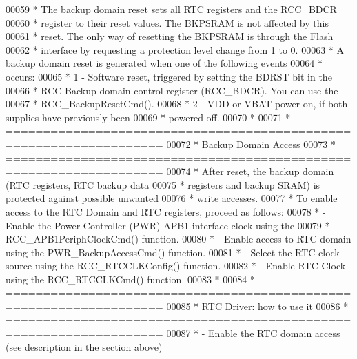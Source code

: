 \begin{DoxyCode}
00059 \textcolor{comment}{  *          The backup domain reset sets all RTC registers and the RCC\_BDCR }
00060 \textcolor{comment}{  *          register to their reset values. The BKPSRAM is not affected by this}
00061 \textcolor{comment}{  *          reset. The only way of resetting the BKPSRAM is through the Flash }
00062 \textcolor{comment}{  *          interface by requesting a protection level change from 1 to 0.}
00063 \textcolor{comment}{  *          A backup domain reset is generated when one of the following events}
00064 \textcolor{comment}{  *          occurs:}
00065 \textcolor{comment}{  *            1 - Software reset, triggered by setting the BDRST bit in the }
00066 \textcolor{comment}{  *                RCC Backup domain control register (RCC\_BDCR). You can use the}
00067 \textcolor{comment}{  *                RCC\_BackupResetCmd().}
00068 \textcolor{comment}{  *            2 - VDD or VBAT power on, if both supplies have previously been}
00069 \textcolor{comment}{  *                powered off.}
00070 \textcolor{comment}{  *}
00071 \textcolor{comment}{  *          ===================================================================}
00072 \textcolor{comment}{  *                                   Backup Domain Access}
00073 \textcolor{comment}{  *          ===================================================================}
00074 \textcolor{comment}{  *          After reset, the backup domain (RTC registers, RTC backup data }
00075 \textcolor{comment}{  *          registers and backup SRAM) is protected against possible unwanted }
00076 \textcolor{comment}{  *          write accesses. }
00077 \textcolor{comment}{  *          To enable access to the RTC Domain and RTC registers, proceed as follows:}
00078 \textcolor{comment}{  *            - Enable the Power Controller (PWR) APB1 interface clock using the}
00079 \textcolor{comment}{  *              RCC\_APB1PeriphClockCmd() function.}
00080 \textcolor{comment}{  *            - Enable access to RTC domain using the PWR\_BackupAccessCmd() function.}
00081 \textcolor{comment}{  *            - Select the RTC clock source using the RCC\_RTCCLKConfig() function.}
00082 \textcolor{comment}{  *            - Enable RTC Clock using the RCC\_RTCCLKCmd() function.}
00083 \textcolor{comment}{  *}
00084 \textcolor{comment}{  *          ===================================================================}
00085 \textcolor{comment}{  *                                   RTC Driver: how to use it}
00086 \textcolor{comment}{  *          ===================================================================}
00087 \textcolor{comment}{  *            - Enable the RTC domain access (see description in the section above)}

\end{DoxyCode}
